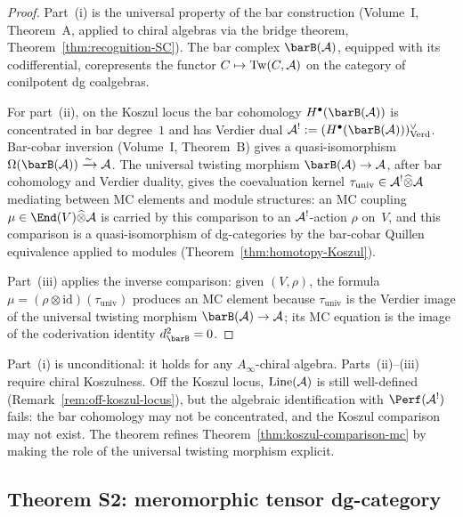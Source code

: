 \begin{proof}
Part~(i) is the universal property of the bar construction
(Volume~I, Theorem~A, applied to chiral algebras via the
bridge theorem, Theorem~\ref{thm:recognition-SC}). The bar
complex $\barB(\cA)$, equipped with its codifferential,
corepresents the functor $C \mapsto \operatorname{Tw}(C, \mathcal{A})$
on the category of conilpotent dg coalgebras.

For part~(ii), on the Koszul locus the bar cohomology
$H^\bullet(\barB(\cA))$ is concentrated in bar degree~$1$ and
has Verdier dual $\cA^! := (H^\bullet(\barB(\cA)))^\vee_{\mathrm{Verd}}$.
Bar-cobar inversion (Volume~I, Theorem~B) gives a quasi-isomorphism
$\Omega(\barB(\cA)) \xrightarrow{\sim} \cA$. The universal
twisting morphism $\barB(\cA)\to\cA$, after bar cohomology and
Verdier duality, gives the coevaluation kernel
$\tau_{\mathrm{univ}} \in \mathcal{A}^! \widehat\otimes \mathcal{A}$ mediating
between MC elements and module structures:
an MC coupling $\mu \in \End(V) \widehat\otimes \cA$ is carried by
this comparison to an $\mathcal{A}^!$-action $\rho$ on~$V$, and this
comparison is a quasi-isomorphism of dg-categories by the
bar-cobar Quillen equivalence applied to modules
(Theorem~\ref{thm:homotopy-Koszul}).

Part~(iii) applies the inverse comparison: given $(V, \rho)$,
the formula $\mu = (\rho \otimes \mathrm{id})(\tau_{\mathrm{univ}})$
produces an MC element because $\tau_{\mathrm{univ}}$ is the Verdier
image of the universal twisting morphism $\barB(\cA)\to\cA$; its MC
equation is the image of the coderivation identity $d_{\barB}^2=0$.
\end{proof}

\begin{remark}
\label{rem:mc-couplings-scope}
Part~(i) is unconditional: it holds for any $A_\infty$-chiral
algebra. Parts~(ii)--(iii) require chiral Koszulness. Off the
Koszul locus, $\operatorname{Line}(\mathcal{A})$ is still well-defined
(Remark~\ref{rem:off-koszul-locus}), but the algebraic
identification with $\Perf(\cA^!)$ fails: the bar cohomology may
not be concentrated, and the Koszul comparison may not exist.
The theorem refines
Theorem~\ref{thm:koszul-comparison-mc} by making the role of
the universal twisting morphism explicit.
\end{remark}

\subsection{Theorem S2: meromorphic tensor dg-category}
\label{subsec:meromorphic-tensor-cat}

